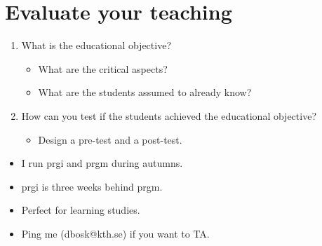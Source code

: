 \section{Evaluate your teaching}

\begin{frame}
  \begin{exercise}
    \begin{enumerate}
      \item What is the educational objective?
        \begin{itemize}
          \item What are the critical aspects?
          \item What are the students assumed to already know?
        \end{itemize}
      \item How can you test if the students achieved the educational 
        objective?
        \begin{itemize}
          \item Design a pre-test and a post-test.
        \end{itemize}
    \end{enumerate}
  \end{exercise}
\end{frame}

\begin{frame}
  \begin{remark}
    \begin{itemize}
      \item I run prgi and prgm during autumns.
      \item prgi is three weeks behind prgm.
      \item Perfect for learning studies.
      \item Ping me (dbosk@kth.se) if you want to TA.
    \end{itemize}
  \end{remark}
\end{frame}
